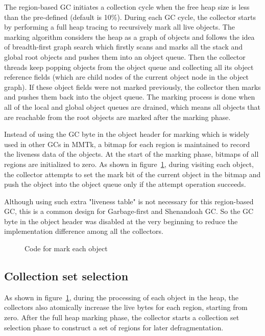 The region-based GC initiates a collection cycle when the free heap size is less than
the pre-defined  (default is 10\%). During each GC cycle,
the collector starts by performing a full heap tracing to recursively mark all live objects.
The marking algorithm considers the heap as a graph of objects and follows the idea of breadth-first graph search
which firstly scans and marks all the stack and global root objects and pushes them into an object queue.
Then the collector threads keep popping objects from the object queue and collecting all its
object reference fields (which are child nodes of the current object node in the object graph).
If these object fields were not marked previously, the collector then marks and pushes them back into the object queue.
The marking process is done when all of the local and global object queues are drained, which means all objects that are reachable
from the root objects are marked after the marking phase.

Instead of using the GC byte in the object header for marking which is widely used in other GCs in MMTk,
a bitmap for each region is maintained to record the liveness data of the objects.
At the start of the marking phase, bitmaps of all regions are initialized to zero.
As shown in figure~\ref{fig:tracemarkobject}, during visiting each object, the collector attempts to set the mark bit
of the current object in the bitmap and push the object into the object queue only if the attempt operation succeeds.

Although using such extra "liveness table" is not necessary for this region-based GC,
this is a common design for Garbage-first and Shenandoah GC.
So the GC byte in the object header was disabled at the very beginning to reduce the implementation difference among all the collectors.

\begin{figure}
  \centering
  
  \caption{Code for mark each object}
  \label{fig:tracemarkobject}
\end{figure}

\subsection{Collection set selection}

As shown in figure~\ref{fig:tracemarkobject}, during the processing of each object in the heap,
the collectors also atomically increase the live bytes for each region, starting from zero.
After the full heap marking phase, the collector starts a collection set selection phase to construct
a set of regions for later defragmentation.

